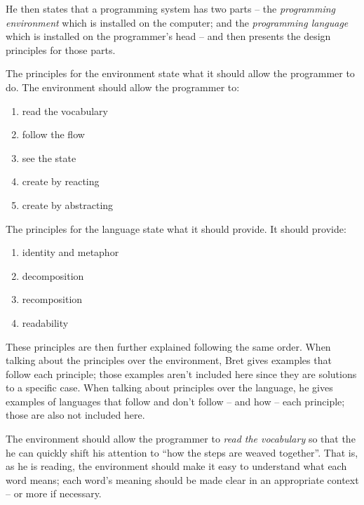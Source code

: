 \documentclass{./llncs2e/llncs}
\begin{document}
	He then states that a programming system has two parts -- the \emph{programming environment} which is installed on the computer; and the \emph{programming language} which is installed on the programmer's head -- and then presents the design principles for those parts.

	The principles for the environment state what it should allow the programmer to do. 
	The environment should allow the programmer to:
	\begin{enumerate}
		\item \label{lp:env:read} read the vocabulary 
		\item \label{lp:env:flow} follow the flow
		\item \label{lp:env:state} see the state
		\item \label{lp:env:react} create by reacting
		\item \label{lp:env:abstr} create by abstracting
	\end{enumerate}

	The principles for the language state what it should provide. 
	It should provide:
	\begin{enumerate}
		\item \label{lp:lang:id} identity and metaphor
		\item \label{lp:lang:decom} decomposition
		\item \label{lp:lang:recom} recomposition
		\item \label{lp:lang:read} readability
	\end{enumerate}

	These principles are then further explained following the same order. 
	When talking about the principles over the environment, Bret gives examples that follow each principle; those examples aren't included here since they are solutions to a specific case. 
	When talking about principles over the language, he gives examples of languages that follow and don't follow -- and how -- each principle; those are also not included here.

	The environment should allow the programmer to \emph{read the vocabulary} so that the he can quickly shift his attention to ``how the steps are weaved together''. 
	That is, as he is reading, the environment should make it easy to understand what each word means; each word's meaning should be made clear in an appropriate context -- or more if necessary.
\end{document}
